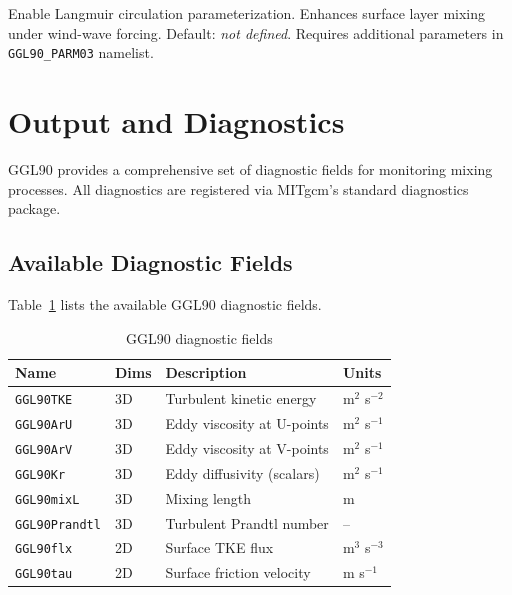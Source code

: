 \documentclass[12pt,letterpaper]{article}
\begin{document}
Enable Langmuir circulation parameterization. Enhances surface layer mixing under wind-wave forcing. Default: \emph{not defined}. Requires additional parameters in \verb|GGL90_PARM03| namelist.

\section{Output and Diagnostics}
\label{sec:diagnostics}

GGL90 provides a comprehensive set of diagnostic fields for monitoring mixing processes. All diagnostics are registered via MITgcm's standard diagnostics package.

\subsection{Available Diagnostic Fields}
\label{sec:diag_fields}

Table~\ref{tab:ggl90_diagnostics} lists the available GGL90 diagnostic fields.

\begin{table}[ht]
\centering
\caption{GGL90 diagnostic fields}
\label{tab:ggl90_diagnostics}
\small
\begin{tabular}{llp{5cm}l}
\toprule
\textbf{Name} & \textbf{Dims} & \textbf{Description} & \textbf{Units} \\
\midrule
\verb|GGL90TKE| & 3D & Turbulent kinetic energy & m$^2$ s$^{-2}$ \\
\verb|GGL90ArU| & 3D & Eddy viscosity at U-points & m$^2$ s$^{-1}$ \\
\verb|GGL90ArV| & 3D & Eddy viscosity at V-points & m$^2$ s$^{-1}$ \\
\verb|GGL90Kr | & 3D & Eddy diffusivity (scalars) & m$^2$ s$^{-1}$ \\
\verb|GGL90mixL| & 3D & Mixing length & m \\
\verb|GGL90Prandtl| & 3D & Turbulent Prandtl number & -- \\
\addlinespace
\verb|GGL90flx | & 2D & Surface TKE flux & m$^3$ s$^{-3}$ \\
\verb|GGL90tau | & 2D & Surface friction velocity & m s$^{-1}$ \\
\bottomrule
\end{tabular}
\end{table}
\end{document}
